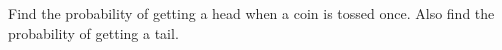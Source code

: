  Find the probability of getting a head when a coin is tossed once. Also
find the probability of getting a tail.
